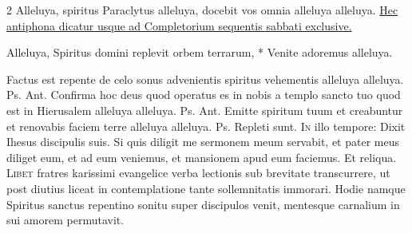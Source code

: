 \begin{multicols*}{2}
 Alleluya, spiritus Paraclytus alleluya, docebit vos omnia alleluya alleluya. \ul{Hec antiphona dicatur usque ad Completorium sequentis sabbati exclusive.}
{\color{Red} }
\begin{invitatory}
{Alleluya, Spiritus domini replevit orbem terrarum, * Venite adoremus alleluya.}
\end{invitatory}
 Factus est repente de celo sonus advenientis spiritus vehementis alleluya alleluya. {\color{Red} Ps.}  {\color{Red} Ant.} Confirma hoc deus quod operatus es in nobis a templo sancto tuo quod est in Hierusalem alleluya alleluya. {\color{Red} Ps.}  {\color{Red} Ant.} Emitte spiritum tuum et creabuntur et renovabis faciem terre alleluya alleluya. {\color{Red} Ps.}  \V Repleti sunt.
\lettrine[lines=2]{\zallmancaps \color{Red} I}{n} illo tempore: Dixit Ihesus discipulis suis. Si quis diligit me sermonem meum servabit, et pater meus diliget eum, et ad eum veniemus, et mansionem apud eum faciemus. Et reliqua.
\lettrine[lines=2]{\zallmancaps \color{Blue} L}{ibet} fratres karissimi evangelice verba lectionis sub brevitate transcurrere, ut post diutius liceat in contemplatione tante sollemnitatis immorari. Hodie namque Spiritus sanctus repentino sonitu super discipulos venit, mentesque carnalium in sui amorem permutavit. \R

\end{multicols*}
